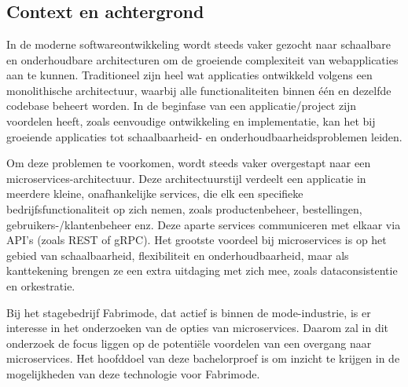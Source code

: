 
\chapter{}%
\label{ch:inleiding}

\section{Context en achtergrond}

In de moderne softwareontwikkeling wordt steeds vaker gezocht naar schaalbare en onderhoudbare architecturen om de groeiende complexiteit van webapplicaties aan te kunnen. Traditioneel zijn heel wat applicaties ontwikkeld volgens een monolithische architectuur, waarbij alle functionaliteiten binnen één en dezelfde codebase beheert worden. In de beginfase van een applicatie/project zijn voordelen heeft, zoals eenvoudige ontwikkeling en implementatie, kan het bij groeiende applicaties tot schaalbaarheid- en onderhoudbaarheidsproblemen leiden.

Om deze problemen te voorkomen, wordt steeds vaker overgestapt naar een microservices-architectuur. Deze architectuurstijl verdeelt een applicatie in meerdere kleine, onafhankelijke services, die elk een specifieke bedrijfsfunctionaliteit op zich nemen, zoals productenbeheer, bestellingen, gebruikers-/klantenbeheer enz. Deze aparte services communiceren met elkaar via API's (zoals REST of gRPC). Het grootste voordeel bij microservices is op het gebied van schaalbaarheid, flexibiliteit en onderhoudbaarheid, maar als kanttekening brengen ze een extra uitdaging met zich mee, zoals dataconsistentie en orkestratie.

Bij het stagebedrijf Fabrimode, dat actief is binnen de mode-industrie, is er interesse in het onderzoeken van de opties van microservices. Daarom zal in dit onderzoek de focus liggen op de potentiële voordelen van een overgang naar microservices. Het hoofddoel van deze bachelorproef is om inzicht te krijgen in de mogelijkheden van deze technologie voor Fabrimode.


